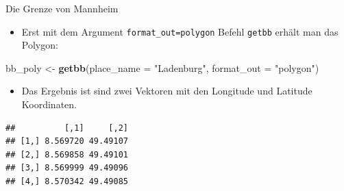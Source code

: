 \documentclass[ignorenonframetext,]{beamer}
\newenvironment{Shaded}{\begin{snugshade}}{\end{snugshade}}
\newcommand{\DataTypeTok}[1]{\textcolor[rgb]{0.13,0.29,0.53}{#1}}
\newcommand{\KeywordTok}[1]{\textcolor[rgb]{0.13,0.29,0.53}{\textbf{#1}}}
\newcommand{\NormalTok}[1]{#1}
\newcommand{\StringTok}[1]{\textcolor[rgb]{0.31,0.60,0.02}{#1}}
\providecommand{\tightlist}{%
  \setlength{\itemsep}{0pt}\setlength{\parskip}{0pt}}
\begin{document}
\begin{frame}[fragile]{Die Grenze von Mannheim}
\protect\hypertarget{die-grenze-von-mannheim}{}

\begin{itemize}
\tightlist
\item
  Erst mit dem Argument \texttt{format\_out=polygon} Befehl
  \texttt{getbb} erhält man das Polygon:
\end{itemize}

\begin{Shaded}
\begin{Highlighting}[]
\NormalTok{bb_poly <-}\StringTok{ }\KeywordTok{getbb}\NormalTok{(}\DataTypeTok{place_name =} \StringTok{"Ladenburg"}\NormalTok{, }
                 \DataTypeTok{format_out =} \StringTok{"polygon"}\NormalTok{)}
\end{Highlighting}
\end{Shaded}

\begin{itemize}
\tightlist
\item
  Das Ergebnis ist sind zwei Vektoren mit den Longitude und Latitude
  Koordinaten.
\end{itemize}

\begin{verbatim}
##          [,1]     [,2]
## [1,] 8.569720 49.49107
## [2,] 8.569858 49.49101
## [3,] 8.569999 49.49096
## [4,] 8.570342 49.49085
\end{verbatim}

\end{frame}
\end{document}
